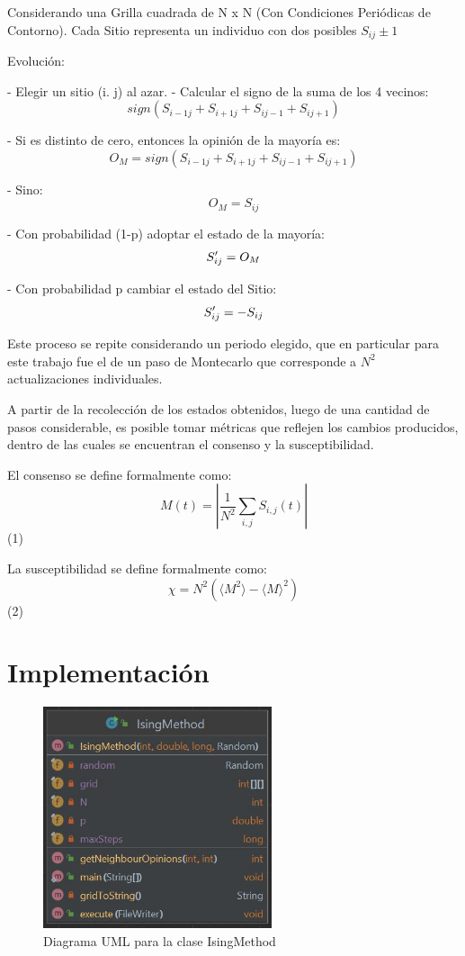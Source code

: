 \documentclass[12pt]{article}
\begin{document}
Considerando una Grilla cuadrada de N x N (Con Condiciones Periódicas de Contorno).
Cada Sitio representa un individuo con dos posibles $S_{ij}\pm1$

Evolución:

- Elegir un sitio (i. j) al azar.
- Calcular el signo de la suma de los 4 vecinos: $$sign(S_{i-1 j}\!+\!S_{i+1j}\!+\!S_{i j-1}\!+\!S_{i j+1})$$

    - Si es distinto de cero, entonces la opinión de la mayoría es:
$$O_{M}=sign(S_{i-1 j}\!+\!S_{i+1j}\!+\!S_{i j-1}\!+\!S_{i j+1})$$

    - Sino:
$$O_{M}=S_{ij}$$

- Con probabilidad (1-p) adoptar el estado de la mayoría: $$S\space^\prime_{ij}=O_{M}$$

- Con probabilidad p cambiar el estado del Sitio: $$S\space^\prime_{ij}=-S_{ij}$$


Este proceso se repite considerando un periodo elegido, que en particular para este trabajo fue el de un paso de Montecarlo que corresponde a $N^{2}$ actualizaciones individuales.

A partir de la recolección de los estados obtenidos, luego de una cantidad de pasos considerable, es posible tomar métricas que reflejen los cambios producidos, dentro de las cuales se encuentran el consenso y la susceptibilidad.

El consenso se define formalmente como:
    $$M(t)=|{\frac{1}{N^{2}}}\sum_{i,j}S_{i,j}(t)|$$ (1)

La susceptibilidad se define formalmente como:
    $$\chi=N^{2}\left(\langle M^{2}\rangle-\langle M\rangle^{2}\right)$$ (2)

\section{Implementación}
\begin{figure}[h]
    \centering
    \includegraphics[width=0.6\textwidth]{uml_ising_method.JPG} 
    \caption{Diagrama UML para la clase IsingMethod}
    \label{fig:example}
\end{figure}
\end{document}
